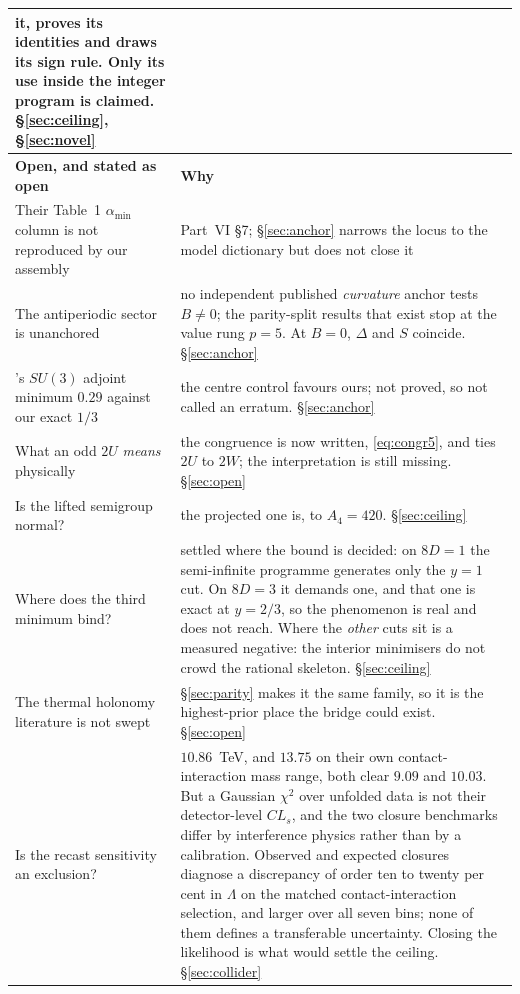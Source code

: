 \documentclass[11pt,a4paper]{article}
\newcommand{\su}[1]{SU(#1)}
\newcommand{\amin}{\alpha_{\min}}
\begin{document}
\begin{longtable}{p{}p{}}
it, proves its identities and draws its sign rule. Only its use inside the integer program is
claimed. \S\ref{sec:ceiling}, \S\ref{sec:novel}\\
\midrule
\rowcolor{amber!14}\textbf{Open, and stated as open} & \textbf{Why}\\
\midrule
Their Table~1 $\amin$ column is not reproduced by our assembly & Part~VI \S7; \S\ref{sec:anchor}
narrows the locus to the model dictionary but does not close it\\
The antiperiodic sector is unanchored & no independent published \emph{curvature} anchor tests
$B\neq0$; the parity-split results that exist stop at the value rung $p=5$. At $B=0$, $\Delta$ and
$S$ coincide. \S\ref{sec:anchor}\\
\cite{vGIQ}'s $\su3$ adjoint minimum $0.29$ against our exact $1/3$ & the centre control favours
ours; not proved, so not called an erratum. \S\ref{sec:anchor}\\
What an odd $2U$ \emph{means} physically & the congruence is now written,
\eqref{eq:congr5}, and ties $2U$ to $2W$; the interpretation is still missing. \S\ref{sec:open}\\
Is the lifted semigroup normal? & the projected one is, to $A_4=420$. \S\ref{sec:ceiling}\\
Where does the third minimum bind? & settled where the bound is decided: on $8D=1$ the
semi-infinite programme generates only the $y=1$ cut. On $8D=3$ it demands one, and that one is
exact at $y=2/3$, so the phenomenon is real and does not reach. Where the \emph{other} cuts sit is
a measured negative: the interior minimisers do not crowd the rational skeleton.
\S\ref{sec:ceiling}\\
The thermal holonomy literature is not swept & \S\ref{sec:parity} makes it the same family, so it
is the highest-prior place the bridge could exist. \S\ref{sec:open}\\
Is the recast sensitivity an exclusion? & $10.86$~TeV, and $13.75$ on their own contact-interaction
mass range, both clear $9.09$ and $10.03$. But a Gaussian $\chi^2$ over unfolded data is not
their detector-level $CL_s$, and the two closure benchmarks differ by interference physics rather
than by a calibration. Observed and expected closures diagnose a discrepancy of order ten to twenty
per cent in $\Lambda$ on the matched contact-interaction selection, and larger over all seven bins;
none of them defines a transferable uncertainty. Closing the likelihood is what would settle the
ceiling.
\S\ref{sec:collider}\\

\end{longtable}
\end{document}
